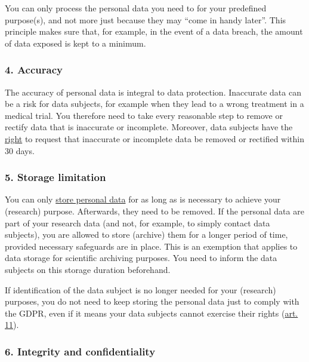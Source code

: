\documentclass[
]{book}
\begin{document}
You can only process the personal data you need to for your predefined purpose(s),
and not more just because they may ``come in handy later''. This principle makes
sure that, for example, in the event of a data breach, the amount of data exposed
is kept to a minimum.

\hypertarget{accuracy}{%
\subsubsection{4. Accuracy}\label{accuracy}}

The accuracy of personal data is integral to data protection. Inaccurate data
can be a risk for data subjects, for example when they lead to a wrong treatment
in a medical trial. You therefore need to take every reasonable step to remove
or rectify data that is inaccurate or incomplete. Moreover, data subjects have
the \protect\hyperlink{data-subject-rights}{right} to request that inaccurate or
incomplete data be removed or rectified within 30 days.

\hypertarget{storage-limitation}{%
\subsubsection{5. Storage limitation}\label{storage-limitation}}

You can only \protect\hyperlink{data-storage}{store personal data} for as long as is
necessary to achieve your (research) purpose. Afterwards, they need to be
removed. If the personal data are part of your research data (and not, for
example, to simply contact data subjects), you are allowed to store (archive)
them for a longer period of time, provided necessary safeguards are in place.
This is an exemption that applies to data storage for scientific archiving
purposes. You need to inform the data subjects on this storage duration beforehand.

If identification of the data subject is no longer needed for your
(research) purposes, you do not need to keep storing the personal data just
to comply with the GDPR, even if it means your data subjects cannot exercise
their rights (\href{https://gdpr-info.eu/art-11-gdpr/}{art. 11}).

\hypertarget{integrity-and-confidentiality}{%
\subsubsection{6. Integrity and confidentiality}\label{integrity-and-confidentiality}}
\end{document}
